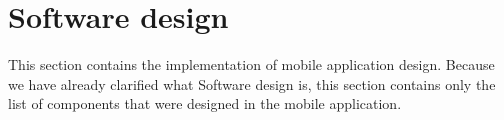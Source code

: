 \section{Software design}\label{sec:software-design}
This section contains the implementation of mobile application design.
Because we have already clarified what Software design is, this section contains only the list of components that were designed in the mobile application.







